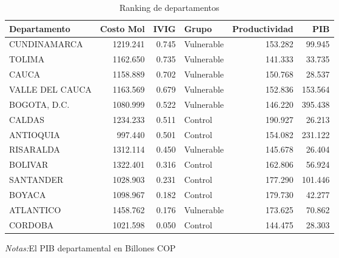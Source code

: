\documentclass[12pt]{article}
\begin{document}
\setcounter{table}{6}
\begin{table}[htbp]
\centering
\begin{threeparttable}

\caption{Ranking de departamentos}
\begin{tabular}[t]{lrrlrr}
\toprule
Departamento & Costo Mol & IVIG & Grupo & Productividad & PIB\\
\midrule
CUNDINAMARCA & 1219.241 & 0.745 & Vulnerable & 153.282 & 99.945\\
TOLIMA & 1162.650 & 0.735 & Vulnerable & 141.333 & 33.735\\
CAUCA & 1158.889 & 0.702 & Vulnerable & 150.768 & 28.537\\
VALLE DEL CAUCA & 1163.569 & 0.679 & Vulnerable & 152.836 & 153.564\\
BOGOTA, D.C. & 1080.999 & 0.522 & Vulnerable & 146.220 & 395.438\\
\addlinespace
CALDAS & 1234.233 & 0.511 & Control & 190.927 & 26.213\\
ANTIOQUIA & 997.440 & 0.501 & Control & 154.082 & 231.122\\
RISARALDA & 1312.114 & 0.450 & Vulnerable & 145.678 & 26.404\\
BOLIVAR & 1322.401 & 0.316 & Control & 162.806 & 56.924\\
SANTANDER & 1028.903 & 0.231 & Control & 177.290 & 101.446\\
\addlinespace
BOYACA & 1098.967 & 0.182 & Control & 179.730 & 42.277\\
ATLANTICO & 1458.762 & 0.176 & Vulnerable & 173.625 & 70.862\\
CORDOBA & 1021.598 & 0.050 & Control & 144.475 & 28.303\\
\bottomrule
\end{tabular}
\begin{tablenotes}
\footnotesize
\item \textit{Notas:}El PIB departamental en Billones COP
\end{tablenotes}
\end{threeparttable}
\end{table}
\end{document}
